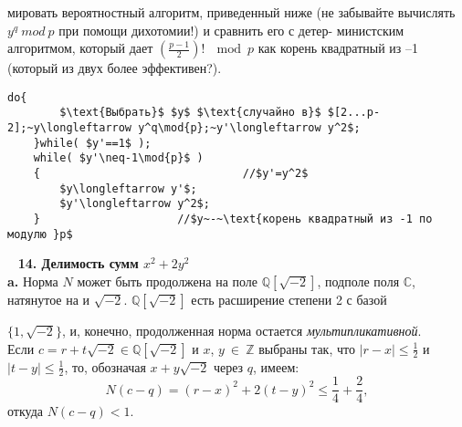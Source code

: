 мировать вероятностный алгоритм, приведенный ниже (не забывайте\linebreak
вычислять $y^q~mod~p$ при помощи дихотомии!) и сравнить его с детер­-\linebreak
министским алгоритмом, который дает $(\frac{p-1}{2})!~\mod{p}$ как корень\linebreak 
ква­дратный из --1 (который из двух более эффективен?).\\
\begin{lstlisting}[mathescape=true,showspaces=false]
	do{
		$\text{Выбрать}$ $y$ $\text{случайно в}$ $[2...p-2];~y\longleftarrow y^q\mod{p};~y'\longleftarrow y^2$;
	}while( $y'==1$ );
	while( $y'\neq-1\mod{p}$ )
	{		 						//$y'=y^2$
		$y\longleftarrow y'$;
		$y'\longleftarrow y^2$;
	}     				  //$y~-~\text{корень квадратный из -1 по модулю }p$
\end{lstlisting}
\ \newline
\noindent\textbf{14. Делимость сумм $x^2+2y^2$} \newline 
\\
\hspace*{15pt}\textbf{a.} Норма $N$ может быть продолжена на поле $\mathbb{Q}[\sqrt{-2}]$, подполе поля\linebreak
$\mathbb{C}$,\: натянутое\: на\: и\:\: $\sqrt{-2}$.\:\: $\mathbb{Q}[\sqrt{-2}]$\:\: есть\: расширение\: степени 2 с базой%
\pagebreak
%

\noindent $\{1,\sqrt{-2}\}$, и, конечно, продолженная норма остается \textit{мультипликативной}.\\

Если $c=r+t\sqrt{-2}\in\mathbb{Q}[\sqrt{-2}]$ и $x$, $y~\in~\mathbb{Z}$ выбраны так, что $|r-x|\leqslant\frac{1}{2}$\linebreak
и $|t-y|\leqslant\frac{1}{2}$, то, обозначая $x+y\sqrt{-2}$ через $q$, имеем:
$$ N(c-q)=(r-x)^2+2(t-y)^2\leqslant\frac{1}{4}+\frac{2}{4},$$
откуда $N(c-q)<1$.

